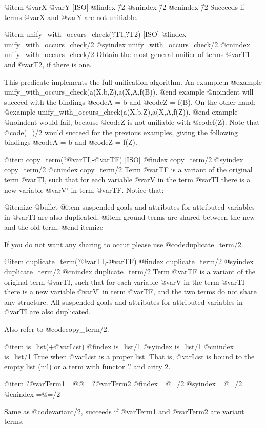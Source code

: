 {{{{@item @var{X} \= @var{Y} [ISO]
@findex \=/2
@snindex \=/2
@cnindex \=/2
Succeeds if terms @var{X} and @var{Y} are not unifiable.

@item unify_with_occurs_check(?T1,?T2) [ISO]
@findex unify_with_occurs_check/2
@syindex unify_with_occurs_check/2
@cnindex unify_with_occurs_check/2
Obtain the most general unifier of terms @var{T1} and @var{T2}, if there
is one.

This predicate implements the full unification algorithm. An example:n
@example
unify_with_occurs_check(a(X,b,Z),a(X,A,f(B)).
@end example
@noindent
will succeed with the bindings @code{A = b} and @code{Z = f(B)}. On the
other hand:
@example
unify_with_occurs_check(a(X,b,Z),a(X,A,f(Z)).
@end example
@noindent
would fail, because @code{Z} is not unifiable with @code{f(Z)}. Note that
@code{(=)/2} would succeed for the previous examples, giving the following
bindings @code{A = b} and @code{Z = f(Z)}.


@item copy_term(?@var{TI},-@var{TF}) [ISO]
@findex copy_term/2
@syindex copy_term/2
@cnindex copy_term/2
Term @var{TF} is a variant of the original term @var{TI}, such that for
each variable @var{V} in the term @var{TI} there is a new variable @var{V'}
in term @var{TF}. Notice that:

@itemize @bullet
@item suspended goals and attributes for attributed variables in
  @var{TI} are also duplicated;
@item ground terms are shared between the new and the old term.
@end itemize

If you do not want any sharing to occur please use
@code{duplicate_term/2}.

@item duplicate_term(?@var{TI},-@var{TF})
@findex duplicate_term/2
@syindex duplicate_term/2
@cnindex duplicate_term/2
Term @var{TF} is a variant of the original term @var{TI}, such that
for each variable @var{V} in the term @var{TI} there is a new variable
@var{V'} in term @var{TF}, and the two terms do not share any
structure. All suspended goals and attributes for attributed variables
in @var{TI} are also duplicated.

Also refer to @code{copy_term/2}.

@item is_list(+@var{List})
@findex is_list/1
@syindex is_list/1
@cnindex is_list/1
True when @var{List} is a proper list. That is, @var{List}
is bound to the empty list (nil) or a term with functor '.' and arity 2.

@item ?@var{Term1} =@@= ?@var{Term2}
@findex  =@=/2
@syindex =@=/2
@cnindex =@=/2

Same as @code{variant/2}, succeeds if @var{Term1} and @var{Term2} are variant terms.


}}}}

